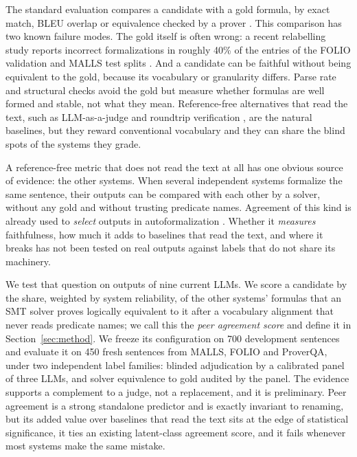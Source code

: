 \documentclass[11pt,letterpaper]{article}
\begin{document}
The standard evaluation compares a candidate with a gold formula, by exact match, BLEU overlap or equivalence checked by a prover \citep{Han2022,Yang2023,Thatikonda2025}. This comparison has two known failure modes. The gold itself is often wrong: a recent relabelling study reports incorrect formalizations in roughly 40\% of the entries of the FOLIO validation and MALLS test splits \citep{Brunello2026}. And a candidate can be faithful without being equivalent to the gold, because its vocabulary or granularity differs. Parse rate and structural checks avoid the gold but measure whether formulas are well formed and stable, not what they mean. Reference-free alternatives that read the text, such as LLM-as-a-judge \citep{Zheng2023} and roundtrip verification \citep{Amrollahi2026}, are the natural baselines, but they reward conventional vocabulary and they can share the blind spots of the systems they grade.

A reference-free metric that does not read the text at all has one obvious source of evidence: the other systems. When several independent systems formalize the same sentence, their outputs can be compared with each other by a solver, without any gold and without trusting predicate names. Agreement of this kind is already used to \emph{select} outputs in autoformalization \citep{Li2024,Ryu2024}. Whether it \emph{measures} faithfulness, how much it adds to baselines that read the text, and where it breaks has not been tested on real outputs against labels that do not share its machinery.

We test that question on outputs of nine current LLMs. We score a candidate by the share, weighted by system reliability, of the other systems' formulas that an SMT solver proves logically equivalent to it after a vocabulary alignment that never reads predicate names; we call this the \emph{peer agreement score} and define it in Section~\ref{sec:method}. We freeze its configuration on 700 development sentences and evaluate it on 450 fresh sentences from MALLS, FOLIO and ProverQA, under two independent label families: blinded adjudication by a calibrated panel of three LLMs, and solver equivalence to gold audited by the panel. The evidence supports a complement to a judge, not a replacement, and it is preliminary. Peer agreement is a strong standalone predictor and is exactly invariant to renaming, but its added value over baselines that read the text sits at the edge of statistical significance, it ties an existing latent-class agreement score, and it fails whenever most systems make the same mistake.
\end{document}
